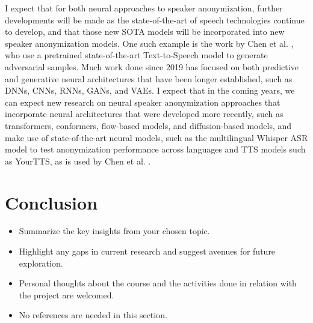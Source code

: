 \documentclass{Interspeech2024}
\begin{document}
I expect that for both neural approaches to speaker anonymization, further developments will be made as the state-of-the-art of speech technologies continue to develop, and that those new SOTA models will be incorporated into new speaker anonymization models.
One such example is the work by Chen et al. \cite{chen_2024_adversarial_yourtts}, who use a pretrained state-of-the-art Text-to-Speech model to generate adversarial samples.
Much work done since 2019 has focused on both predictive and generative neural architectures that have been longer established, such as DNNs, CNNs, RNNs, GANs, and VAEs.
I expect that in the coming years, we can expect new research on neural speaker anonymization approaches that incorporate neural architectures that were developed more recently, such as transformers, conformers, flow-based models, and diffusion-based models, and make use of state-of-the-art neural models, such as the multilingual Whisper ASR model to test anonymization performance across languages and TTS models such as YourTTS, as is used by Chen et al. \cite{chen_2024_adversarial_yourtts}.


\section{Conclusion}

\begin{itemize}
    \item Summarize the key insights from your chosen topic.
    \item Highlight any gaps in current research and suggest avenues for future exploration.
    \item Personal thoughts about the course and the activities done in relation with the project are welcomed.
    \item No references are needed in this section.
\end{itemize}






\end{document}
